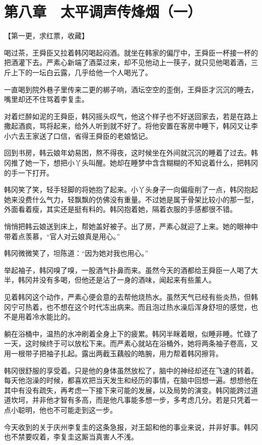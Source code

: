 \section{第八章　太平调声传烽烟（一）}

【第一更，求红票，收藏】

喝过茶，王舜臣又拉着韩冈喝起闷酒。就坐在韩家的偏厅中，王舜臣一杯接一杯的把酒灌下去。严素心新端了酒菜过来，却不见他动上一筷子，就只见他喝着酒，三斤上下的一坛白云露，几乎给他一个人喝光了。

一直喝到院外巷子里传来二更的梆子响，酒坛空空的歪倒，王舜臣才沉沉的睡去，嘴里却还不住骂着李复圭。

对着烂醉如泥的王舜臣，韩冈摇头叹气，他这个样子也不好送回家去，若是在路上撒起酒疯，骂将起来，给外人听到就不好了。将他安置在客房中睡下，韩冈又让李小六去王家送了口信，省得王舜臣的老娘惦记。

回到书房，韩云娘年幼易困，熬不得夜，这时候坐在外间就沉沉的睡着了过去。韩冈推了她一下，想把小丫头叫醒。她却在睡梦中含含糊糊的不知说着什么，把韩冈的手一下打开。

韩冈笑了笑，轻手轻脚的将她抱了起来。小丫头身子一向偏瘦削了一点，韩冈抱起她来没费什么气力，轻飘飘的仿佛没有重量。不过她是属于骨架比较小的那一型，外面看着瘦，其实还是挺有料的。韩冈抱着她，隔着衣服的手感都很不错。

悄悄把韩云娘送到床上，帮她盖好被子。出了房，严素心就迎了上来。她的眼神中带着点羡慕，“官人对云娘真是用心。”

韩冈微微笑了，坦陈道：“因为她对我也用心。”

举起袖子，韩冈嗅了嗅，一股酒气扑鼻而来。虽然今天的酒都给王舜臣一人喝了大半，韩冈并没有多喝，但他还是沾了一身的酒味，闻起来有些薰人。

见着韩冈这个动作，严素心便会意的去帮他烧热水。虽然天气已经有些炎热，但韩冈宁可热着，也不想在这个时代冻出病来。而且泡过热水澡后浑身舒坦的感觉，也不是用着冷水能比的。

躺在浴桶中，温热的水冲刷着全身上下的疲累。韩冈半眯着眼，似睡非睡。忙碌了一天，这时候终于可以放松下来。而严素心就站在浴桶外，她将两条袖子卷高，又用一根带子把袖子扎起。露出两截玉藕般的皓腕，用力帮着韩冈擦背。

韩冈很舒服的享受着。只是他的身体虽然放松了，脑中的神经却还在飞速的转着。每天他泡澡的时候，都喜欢把当天发生和经历的事情，在脑中回想一遍。想想他在其中有没有疏失，再考虑一下接下来可能的发展，以及局势的演变。韩冈能跨过道道坎坷，并非他才智有多高，而是他凡事能多想一步，多考虑几分。若是只凭着一点小聪明，他也不可能走到这一步。

今天收到的关于庆州李复圭的这条急报，对王韶和他的事业来说，并非好事。韩冈也不禁要叹着，李复圭这厮当真害人不浅。

